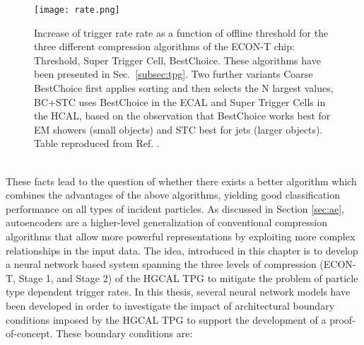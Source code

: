 \documentclass[../../main.tex]{subfiles}
\begin{document}
\begin{figure}[htp]
			\begin{center}
				\texttt{[image: rate.png]}
				\caption{Increase of trigger rate rate as a function of offline threshold for the three different compression algorithms of the ECON-T chip: Threshold, Super Trigger Cell, BestChoice. These algorithms have been presented in Sec.~\ref{subsec:tpg}. Two further variants Coarse BestChoice first applies sorting and then selects the N largest values, BC+STC uses BestChoice in the ECAL and Super Trigger Cells in the HCAL, based on the observation that BestChoice works best for EM showers (small objects) and STC best for jets (larger objects). Table reproduced from Ref. \cite{trig_algos}.}
				\label{fig:trig_algo}
			\end{center}
\end{figure}
\\
These facts lead to the question of whether there exists a better algorithm which combines the advantages of the above algorithms, yielding good classification performance on all types of incident particles. As discussed in Section \ref{sec:ae}, autoencoders are a higher-level generalization of conventional compression algorithms that allow more powerful representations by exploiting more complex relationships in the input data. The idea, introduced in this chapter is to develop a neural network based system spanning the three levels of compression (ECON-T, Stage 1, and Stage 2) of the HGCAL TPG to mitigate the problem of particle type dependent trigger rates. In this thesis, several neural network models have been developed in order to investigate the impact of architectural boundary conditions imposed by the HGCAL TPG to support the development of a proof-of-concept. These boundary conditions are:
\end{document}
